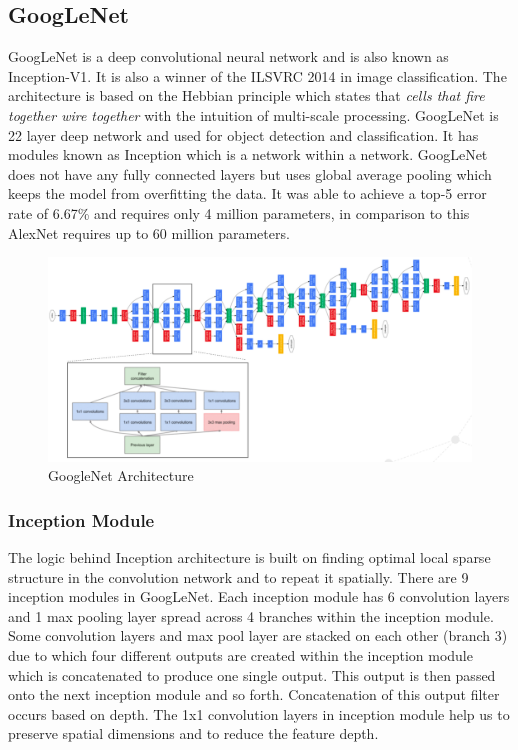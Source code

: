 \subsection{GoogLeNet}\label{GoogLeNet_Topo}
GoogLeNet is a deep convolutional neural network and is also known as Inception-V1. It is also a winner of the ILSVRC 2014 in image classification. The architecture is based on the Hebbian principle which states that \textit{cells that fire together wire together} with the intuition of multi-scale processing. GoogLeNet is 22 layer deep network and used for object detection and classification. It has modules known as Inception which is a network within a network. GoogLeNet does not have any fully connected layers but uses global average pooling which keeps the model from overfitting the data. It was able to achieve a top-5 error rate of 6.67\% and requires only 4 million parameters, in comparison to this AlexNet requires up to 60 million parameters.

\begin{figure}[h!]
    \centering
    \includegraphics[scale=0.4]{img/googlenetarch.png}
    \caption{GoogleNet Architecture}
\end{figure}

\subsubsection{Inception Module}
The logic behind Inception architecture is built on finding optimal local sparse structure in the convolution network and to repeat it spatially. There are 9 inception modules in GoogLeNet. Each inception module has 6 convolution layers and 1 max pooling layer spread across 4 branches within the inception module. Some convolution layers and max pool layer are stacked on each other (branch 3) due to which four different outputs are created within the inception module which is concatenated to produce one single output. This output is then passed onto the next inception module and so forth. Concatenation of this output filter occurs based on depth. The 1x1 convolution layers in inception module help us to preserve spatial dimensions and to reduce the feature depth.

